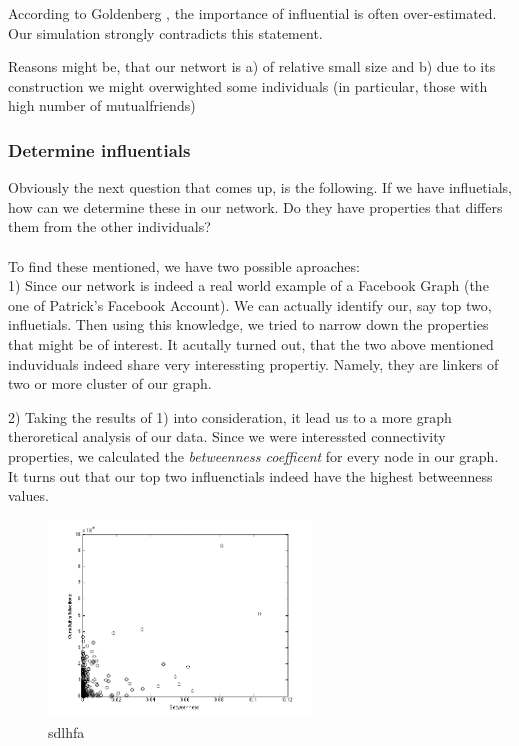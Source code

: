 According to Goldenberg \cite{word2mouth}, the importance of influential is often over-estimated. Our simulation strongly contradicts this statement. 

Reasons might be, that our networt is a) of relative small size and b) due to its construction we might overwighted some individuals (in particular, those with high number of mutualfriends)


\subsubsection{Determine influentials}

Obviously the next question that comes up, is the following. If we have influetials, how can we determine these in our network. Do they have properties that differs them from the other individuals? \\ 
\\
To find these mentioned, we have two possible aproaches: 
\\

1) Since our network is indeed a real world example of a Facebook Graph (the one of Patrick's Facebook Account). We can actually identify our, say top two, influetials. Then using this knowledge, we tried to narrow down the properties that might be of interest. 
It acutally turned out, that the two above mentioned induviduals indeed share very interessting propertiy. Namely, they are linkers of two or more cluster of our graph. 

2) Taking the results of 1) into consideration, it lead us to a more graph theroretical analysis of our data. Since we were interessted connectivity properties, we calculated the \textit{betweenness coefficent} for every node in our graph. 
It turns out that our top two influenctials indeed have the highest betweenness values. 

\begin{figure}
\includegraphics[width=7cm]{influ4}
\caption{sdlhfa}
\label{Betweenness}
\end{figure}

